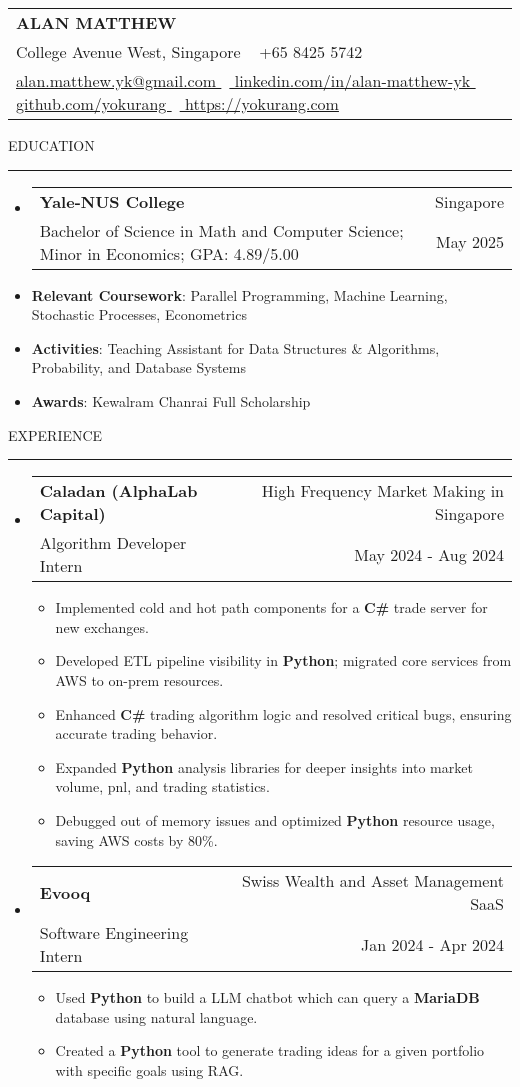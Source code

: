 \documentclass[letterpaper, 11pt]{article}
\makeatletter
\def\sectionlineskip{\medskip}
\def\sectionskip{\medskip}
\def\namesize{\LARGE}
\newcommand{\ResumeHeader}[6]{
  \noindent
  \begin{tabularx}{\textwidth}{>{\centering\arraybackslash}X}
    \namesize\MakeUppercase{\textbf{\fullname}} \\
    #1 \textbar\ #2 \\
    #3 \textbar\ #4 \textbar\ #5 \textbar\ #6 \\
  \end{tabularx}
}
\def \fullname { Alan Matthew }
\def \linkedinlink { https://www.linkedin.com/in/alan-matthew-yk }
\def \linkedintext { linkedin.com/in/alan-matthew-yk }
\def \phonenumber { +65 8425 5742 }
\def \githublink { https://github.com/yokurang }
\def \githubtext { github.com/yokurang }
\def \emaillink { mailto:alan.matthew.yk@gmail.com }
\def \emailtext { alan.matthew.yk@gmail.com }
\def \websitelink { https://yokurang-com.vercel.app/ }
\def \websitetext { https://yokurang.com }
\def \address { 28 College Avenue West, Singapore }
\def \headertype {\ResumeHeader}
\def \linkedin {\href{\linkedinlink}{\linkedintext}}
\def \phone {{\phonenumber}}
\def \email {\href{\emaillink}{\emailtext}}
\def \github {\href{\githublink}{\githubtext}}
\def \website {\href{\websitelink}{\websitetext}}
\newcommand{\SectionHeading}[1]{
  \sectionskip
  \raggedright\raggedbottom\MakeUppercase{\large{#1}}
  \sectionlineskip
  \hrule
  \color{black}
}
\newcommand{\ResumeEntryTSDL}[4]{
  \vspace{1pt}\item
    \begin{tabular*}{\textwidth}[t]{l@{\extracolsep{\fill}}r} 
      \textbf{#1} & #2 \\
      #3 & #4 \\
    \end{tabular*}\vspace{-2.835pt} %
}
\newcommand{\ResumeItem}[2]{
  \item{
    \textbf{#1}{: #2 \vspace{-2.835pt}}
  }
}
\newcommand{\ResumeItemDefault}[1]{
  \item{
    #1 \vspace{-2.835pt}
  }
}
\newcommand{\ResumeSubItem}[2]{\ResumeItem{#1}{#2}\vspace{-2.835pt}}
\newcommand{\ResumeEntryStart}{\begin{itemize}[leftmargin=0mm, label={}]}
\newcommand{\ResumeEntryEnd}{\end{itemize}\vspace{-2.835pt}} %
\newcommand{\ResumeItemListStart}{\begin{itemize}[leftmargin=5mm, label=$\bullet$, itemsep=1mm, parsep=1mm]} %
\newcommand{\ResumeItemListEnd}{\end{itemize}}
\makeatother
\begin{document}
  \headertype{\address}{\phone}{\email}{\linkedin}{\github}{\website}
  
  \SectionHeading{Education}
  \ResumeEntryStart
    \ResumeEntryTSDL{Yale-NUS College} {Singapore}
    {Bachelor of Science in Math and Computer Science; Minor in Economics; GPA: 4.89/5.00} {May 2025}
    \ResumeSubItem{Relevant Coursework}{Parallel Programming, Machine Learning, Stochastic Processes, Econometrics}
    \ResumeSubItem{Activities}{Teaching Assistant for Data Structures \& Algorithms, Probability, and Database Systems}
    \ResumeSubItem{Awards}{Kewalram Chanrai Full Scholarship}
  \ResumeEntryEnd

  \vspace{5pt}

  \SectionHeading{Experience}

  \ResumeEntryStart
  \ResumeEntryTSDL{Caladan (AlphaLab Capital)}{High Frequency Market Making in Singapore}{Algorithm Developer Intern}{May 2024 - Aug 2024}
  \ResumeItemListStart
  \ResumeItemDefault{Implemented cold and hot path components for a \textbf{C\#} trade server for new exchanges.}
  \ResumeItemDefault{Developed ETL pipeline visibility in \textbf{Python}; migrated core services from AWS to on-prem resources.}
  \ResumeItemDefault{Enhanced \textbf{C\#} trading algorithm logic and resolved critical bugs, ensuring accurate trading behavior.}
  \ResumeItemDefault{Expanded \textbf{Python} analysis libraries for deeper insights into market volume, pnl, and trading statistics.}
  \ResumeItemDefault{Debugged out of memory issues and optimized \textbf{Python} resource usage, saving AWS costs by 80\%.}
  \ResumeItemListEnd
  \ResumeEntryEnd

  \ResumeEntryStart
    \ResumeEntryTSDL{Evooq}{Swiss Wealth and Asset Management SaaS}{Software Engineering Intern}{Jan 2024 - Apr 2024}
    \ResumeItemListStart
    \ResumeItemDefault{Used \textbf{Python} to build a LLM chatbot which can query a \textbf{MariaDB} database using natural language.}
    \ResumeItemDefault{Created a \textbf{Python} tool to generate trading ideas for a given portfolio with specific goals using RAG.}
    \ResumeItemListEnd
  \ResumeEntryEnd
\end{document}
